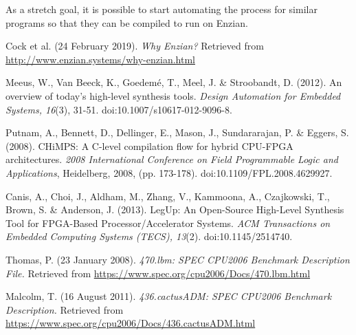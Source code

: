 \documentclass[12pt]{article}
\begin{document}
As a stretch goal, it is possible to start automating the process for similar programs so that they can be compiled to run on Enzian.
\begin{thebibliography}{3}
Cock et al. (24 February 2019). \textit{Why Enzian?}
Retrieved from \url{http://www.enzian.systems/why-enzian.html}

Meeus, W., Van Beeck, K., Goedem{\'e}, T., Meel, J. \& Stroobandt, D. (2012). An overview of today's high-level synthesis tools. \textit{Design Automation for Embedded Systems, 16}(3), 31-51. doi:10.1007/s10617-012-9096-8.

Putnam, A., Bennett, D., Dellinger, E., Mason, J., Sundararajan, P. \& Eggers, S. (2008). CHiMPS: A C-level compilation flow for hybrid CPU-FPGA architectures. \textit{2008 International Conference on Field Programmable Logic and Applications}, Heidelberg, 2008, (pp. 173-178). doi:10.1109/FPL.2008.4629927. 

Canis, A., Choi, J., Aldham, M., Zhang, V., Kammoona, A., Czajkowski, T., Brown, S. \& Anderson, J. (2013). LegUp: An Open-Source High-Level Synthesis Tool for FPGA-Based Processor/Accelerator Systems. \textit{ACM Transactions on Embedded Computing Systems (TECS), 13}(2). doi:10.1145/2514740. 

Thomas, P. (23 January 2008). \textit{470.lbm: SPEC CPU2006 Benchmark Description File.}
Retrieved from \url{https://www.spec.org/cpu2006/Docs/470.lbm.html}

Malcolm, T. (16 August 2011). \textit{436.cactusADM: SPEC CPU2006 Benchmark Description.}
Retrieved from \url{https://www.spec.org/cpu2006/Docs/436.cactusADM.html}

\end{thebibliography}

\newpage
\end{document}
